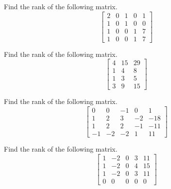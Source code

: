 \documentclass{ximera}
\begin{document}
\begin{problem}\label{prb:2.48} Find the rank of the following matrix.
\begin{equation*}
\left[
\begin{array}{rrrrr}
2 & 0 & 1 & 0 & 1 \\
1 & 0 & 1 & 0 & 0 \\
1 & 0 & 0 & 1 & 7 \\
1 & 0 & 0 & 1 & 7
\end{array}
\right]
\end{equation*}
\end{problem}

\begin{problem}\label{prb:2.49} Find the rank of the following matrix.
\begin{equation*}
\left[
\begin{array}{rrr}
4 & 15 & 29 \\
1 & 4 & 8 \\
1 & 3 & 5 \\
3 & 9 & 15
\end{array}
\right]
\end{equation*}
\end{problem}

\begin{problem}\label{prb:2.50} Find the rank of the following matrix.
\begin{equation*}
\left[
\begin{array}{rrrrr}
0 & 0 & -1 & 0 & 1 \\
1 & 2 & 3 & -2 & -18 \\
1 & 2 & 2 & -1 & -11 \\
-1 & -2 & -2 & 1 & 11
\end{array}
\right]
\end{equation*}
\end{problem}

\begin{problem}\label{prb:2.51} Find the rank of the following matrix.
\begin{equation*}
\left[
\begin{array}{rrrrr}
1 & -2 & 0 & 3 & 11 \\
1 & -2 & 0 & 4 & 15 \\
1 & -2 & 0 & 3 & 11 \\
0 & 0 & 0 & 0 & 0
\end{array}
\right]
\end{equation*}
\end{problem}
\end{document}
